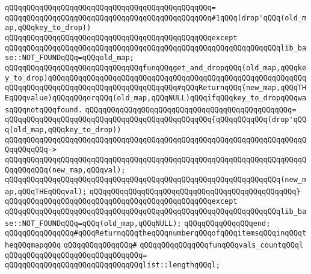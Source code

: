 \verb|qQQqqQQqqQQqqQQqqQQqqQQqqQQqqQQqqQQqqQQqqQQqqQQq=|\newline
\verb|qQQqqQQqqQQqqQQqqQQqqQQqqQQqqQQqqQQqqQQqqQQqqQQq#1qQQq(drop'qQQq(old_map,qQQqkey_to_drop))|\newline
\verb|qQQqqQQqqQQqqQQqqQQqqQQqqQQqqQQqqQQqqQQqqQQqqQQqexcept|\newline
\verb|qQQqqQQqqQQqqQQqqQQqqQQqqQQqqQQqqQQqqQQqqQQqqQQqqQQqqQQqqQQqqQQqlib_base::NOT_FOUNDqQQq=qQQqold_map;|\newline
\newline
\verb|qQQqqQQqqQQqqQQqqQQqqQQqqQQqqQQqfunqQQqget_and_dropqQQq(old_map,qQQqkey_to_drop)qQQqqQQqqQQqqQQqqQQqqQQqqQQqqQQqqQQqqQQqqQQqqQQqqQQqqQQqqQQqqQQqqQQqqQQqqQQqqQQqqQQqqQQqqQQqqQQqqQQq#qQQqReturnqQQq(new_map,qQQqTHEqQQqvalue)qQQqqQQqorqQQq(old_map,qQQqNULL)qQQqifqQQqkey_to_dropqQQqwasqQQqnotqQQqfound.|\newline
\verb|qQQqqQQqqQQqqQQqqQQqqQQqqQQqqQQqqQQqqQQqqQQqqQQq=|\newline
\verb|qQQqqQQqqQQqqQQqqQQqqQQqqQQqqQQqqQQqqQQqqQQqqQQq{qQQqqQQqqQQq(drop'qQQq(old_map,qQQqkey_to_drop))|\newline
\verb|qQQqqQQqqQQqqQQqqQQqqQQqqQQqqQQqqQQqqQQqqQQqqQQqqQQqqQQqqQQqqQQqqQQqqQQqqQQqqQQq->|\newline
\verb|qQQqqQQqqQQqqQQqqQQqqQQqqQQqqQQqqQQqqQQqqQQqqQQqqQQqqQQqqQQqqQQqqQQqqQQqqQQqqQQq(new_map,qQQqval);|\newline
\newline
\verb|qQQqqQQqqQQqqQQqqQQqqQQqqQQqqQQqqQQqqQQqqQQqqQQqqQQqqQQqqQQqqQQq(new_map,qQQqTHEqQQqval);|\newline
\verb|qQQqqQQqqQQqqQQqqQQqqQQqqQQqqQQqqQQqqQQqqQQqqQQq}|\newline
\verb|qQQqqQQqqQQqqQQqqQQqqQQqqQQqqQQqqQQqqQQqqQQqqQQqexcept|\newline
\verb|qQQqqQQqqQQqqQQqqQQqqQQqqQQqqQQqqQQqqQQqqQQqqQQqqQQqqQQqqQQqqQQqlib_base::NOT_FOUNDqQQq=qQQq(old_map,qQQqNULL);|\newline
\verb|qQQqqQQqqQQqqQQqend;|\newline
\newline
\verb|qQQqqQQqqQQqqQQq#qQQqReturnqQQqtheqQQqnumberqQQqofqQQqitemsqQQqinqQQqtheqQQqmapqQQq|\newline
\verb|qQQqqQQqqQQqqQQq#|\newline
\verb|qQQqqQQqqQQqqQQqfunqQQqvals_countqQQql|\newline
\verb|qQQqqQQqqQQqqQQqqQQqqQQqqQQqqQQq=|\newline
\verb|qQQqqQQqqQQqqQQqqQQqqQQqqQQqqQQqlist::lengthqQQql;|\newline
